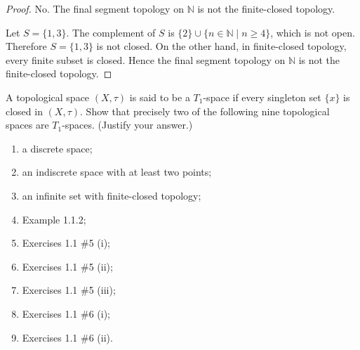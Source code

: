 \begin{proof}
    No. The final segment topology on $\mathbb{N}$ is not the finite-closed topology.

    Let $S = \{ 1, 3 \}$. The complement of $S$ is $\{ 2 \}\cup \{ n\in\mathbb{N} \mid n\geq 4 \}$, which is not open. Therefore $S = \{ 1, 3 \}$ is not closed. On the other hand, in finite-closed topology, every finite subset is closed. Hence the final segment topology on $\mathbb{N}$ is not the finite-closed topology.
\end{proof}
\newpage

\begin{exercise}
    A topological space $(X, \tau)$ is said to be a {\color{red}$T_{1}$-space} if every singleton set $\{ x \}$ is closed in $(X, \tau)$. Show that precisely two of the following nine topological spaces are $T_{1}$-spaces. (Justify your answer.)
    \begin{enumerate}[label={(\roman*)}]
        \item a discrete space;
        \item an indiscrete space with at least two points;
        \item an infinite set with finite-closed topology;
        \item Example 1.1.2;
        \item Exercises 1.1 \#5 (i);
        \item Exercises 1.1 \#5 (ii);
        \item Exercises 1.1 \#5 (iii);
        \item Exercises 1.1 \#6 (i);
        \item Exercises 1.1 \#6 (ii).
    \end{enumerate}
\end{exercise}

